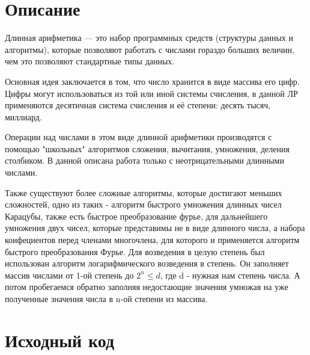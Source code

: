\section{Описание}

Длинная арифметика — это набор программных средств (структуры данных и алгоритмы), которые позволяют работать с числами гораздо больших величин, чем это позволяют стандартные типы данных.

Основная идея заключается в том, что число хранится в виде массива его цифр.
Цифры могут использоваться из той или иной системы счисления, в данной ЛР применяются десятичная система счисления и её степени: десять тысяч, миллиард.

Операции над числами в этом виде длинной арифметики производятся с помощью "школьных" алгоритмов сложения, вычитания, умножения, деления столбиком. В данной описана работа только с неотрицательными длинными числами.

Также существуют более сложные алгоритмы, которые достигают меньших сложностей, одно из таких - алгоритм быстрого умножения длинных чисел Карацубы, также есть быстрое преобразование фурье, для дальнейшего умножения двух чисел, которые представимы не в виде длинного числа, а набора коифециентов перед членами многочлена, для которого и применяется алгоритм быстрого преобразования Фурье. Для возведения в целую степень был использован алгоритм логарифмического возведения в степень. Он заполняет массив числами от 1-ой степень до $2^{n} \leq d$, где d - нужная нам степень числа. А потом пробегаемся обратно заполняя недостающие значения умножая на уже полученные значения числа в n-ой степени из массива.

\pagebreak

\section{Исходный код}

